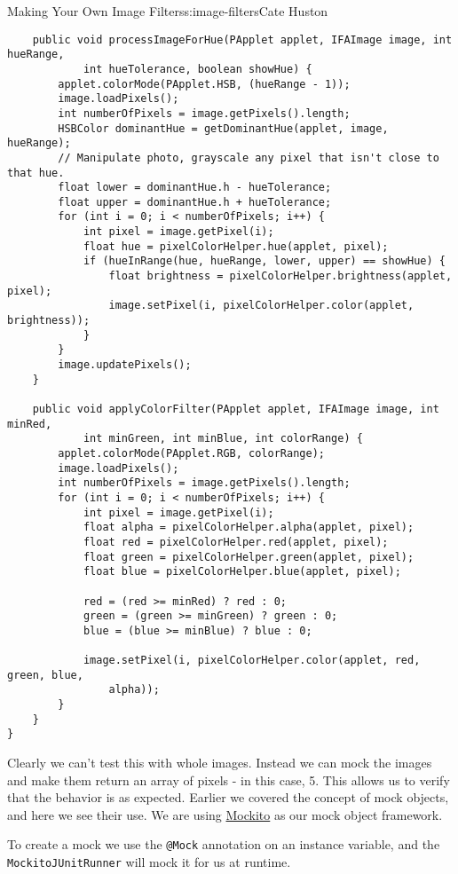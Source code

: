 \begin{aosachapter}{Making Your Own Image Filters}{s:image-filters}{Cate Huston}
\begin{verbatim}
    public void processImageForHue(PApplet applet, IFAImage image, int hueRange,
            int hueTolerance, boolean showHue) {
        applet.colorMode(PApplet.HSB, (hueRange - 1));
        image.loadPixels();
        int numberOfPixels = image.getPixels().length;
        HSBColor dominantHue = getDominantHue(applet, image, hueRange);
        // Manipulate photo, grayscale any pixel that isn't close to that hue.
        float lower = dominantHue.h - hueTolerance;
        float upper = dominantHue.h + hueTolerance;
        for (int i = 0; i < numberOfPixels; i++) {
            int pixel = image.getPixel(i);
            float hue = pixelColorHelper.hue(applet, pixel);
            if (hueInRange(hue, hueRange, lower, upper) == showHue) {
                float brightness = pixelColorHelper.brightness(applet, pixel);
                image.setPixel(i, pixelColorHelper.color(applet, brightness));
            }
        }
        image.updatePixels();
    }

    public void applyColorFilter(PApplet applet, IFAImage image, int minRed,
            int minGreen, int minBlue, int colorRange) {
        applet.colorMode(PApplet.RGB, colorRange);
        image.loadPixels();
        int numberOfPixels = image.getPixels().length;
        for (int i = 0; i < numberOfPixels; i++) {
            int pixel = image.getPixel(i);
            float alpha = pixelColorHelper.alpha(applet, pixel);
            float red = pixelColorHelper.red(applet, pixel);
            float green = pixelColorHelper.green(applet, pixel);
            float blue = pixelColorHelper.blue(applet, pixel);

            red = (red >= minRed) ? red : 0;
            green = (green >= minGreen) ? green : 0;
            blue = (blue >= minBlue) ? blue : 0;

            image.setPixel(i, pixelColorHelper.color(applet, red, green, blue,
                alpha));
        }
    }
}
\end{verbatim}

Clearly we can't test this with whole images. Instead we can mock the
images and make them return an array of pixels - in this case, 5. This
allows us to verify that the behavior is as expected. Earlier we covered
the concept of mock objects, and here we see their use. We are using
\href{http://docs.mockito.googlecode.com/hg/org/mockito/Mockito.html}{Mockito}
as our mock object framework.

To create a mock we use the \texttt{@Mock} annotation on an instance
variable, and the \texttt{MockitoJUnitRunner} will mock it for us at
runtime.


\end{aosachapter}
